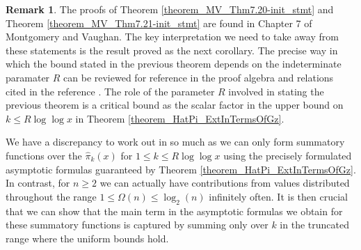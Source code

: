 \documentclass[11pt,reqno,a4letter]{article}
\numberwithin{figure}{section}
\numberwithin{table}{section}
\theoremstyle{plain}
\numberwithin{theorem}{section}
\theoremstyle{definition}
\newtheorem{remark}[theorem]{Remark}
\begin{document}
\begin{remark} 
The proofs of Theorem \ref{theorem_MV_Thm7.20-init_stmt} and 
Theorem \ref{theorem_MV_Thm7.21-init_stmt} 
are found in Chapter 7 of Montgomery and Vaughan. 
The key interpretation we need to take away from these statements 
is the result proved as the next corollary. 
The precise way in which the bound 
stated in the previous theorem depends on the 
indeterminate paramater $R$ can be reviewed for reference in the proof 
algebra and relations cited in the reference \cite[\S 7]{MV}. 
The role of the parameter $R$ involved in stating the previous theorem 
is a critical bound as the scalar factor in the upper bound on $k \leq R\log\log x$ in 
Theorem \ref{theorem_HatPi_ExtInTermsOfGz}. 

We have a discrepancy to work out in so much as we 
can only form summatory functions over the $\widehat{\pi}_k(x)$ for 
$1 \leq k \leq R\log\log x$ using the precisely formulated asymptotic formulas
guaranteed by Theorem \ref{theorem_HatPi_ExtInTermsOfGz}. 
In contrast, for $n \geq 2$ we can actually 
have contributions from values distributed throughout the range $1 \leq \Omega(n) \leq \log_2(n)$ 
infinitely often. 
It is then crucial that we can show that the main term in the asymptotic formulas we obtain 
for these summatory functions is captured by summing only over $k$ in the truncated range 
where the uniform bounds hold. 
\end{remark} 
\end{document}
